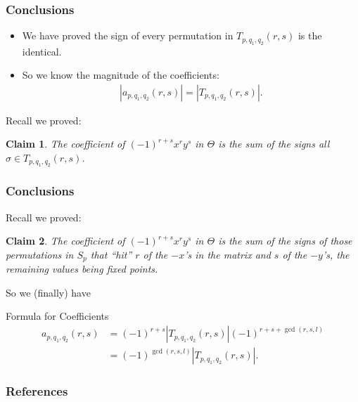 \documentclass{beamer}
\theoremstyle{plain}
\newtheorem*{Claim}{Claim}
\theoremstyle{definition}
\theoremstyle{remark}
\newcommand{\bee}{\begin{equation}\begin{aligned}}
\newcommand{\eee}{\end{aligned}\end{equation}}
\renewcommand{\'}{\hspace{0.5mm}'}		%
\begin{document}

\begin{frame}
\frametitle{Conclusions}

	\begin{itemize}
		\item We have proved the sign of every permutation
		in $T_{p,q_1,q_2}(r,s)$ is the identical. 
		\item So we know the magnitude of the coefficients:
		\bee
			|a_{p,q_1,q_2}(r,s)| = |T_{p,q_1,q_2}(r,s)|. 
		\eee
	\end{itemize}
	Recall we proved:
	\begin{Claim}
		The coefficient of $(-1)^{r + s}x^ry^s$ in $\Theta$
		is the sum of the signs all 
		$\sigma \in T_{p,q_1,q_2}(r,s)$. 
	\end{Claim}
	

\end{frame}


\begin{frame}
\frametitle{Conclusions}

	Recall we proved:
	\begin{Claim}
		The coefficient of $(-1)^{r + s}x^ry^s$ in $\Theta$
		is the sum of the signs of those permutations in 
		$S_p$ that ``hit'' $r$ of the $-x$'s in the matrix
		and $s$ of the $-y$'s, the remaining values being
		fixed points. 
	\end{Claim}
	
	So we (finally) have
	
	\begin{block}{Formula for Coefficients}
		\bee
			a_{p,q_1,q_2}(r,s) &= (-1)^{r + s}
			|T_{p,q_1,q_2}(r,s)|
			(-1)^{r + s + \gcd(r,s,l)}\\
			&= (-1)^{\gcd(r,s,l)}|T_{p,q_1,q_2}(r,s)|. 
		\eee
	\end{block}
	

\end{frame}

















































\begin{frame}
\frametitle{References}
\nocite{*}
%
\printbibliography
\end{frame}

\end{document}

